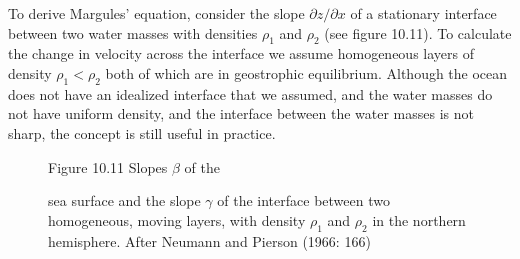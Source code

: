 To derive Margules' equation, consider the slope $\partial z/\partial x$ of a stationary
interface between two water masses with densities $\rho_1$ and $\rho_2$ (see
figure 10.11). To calculate the change in velocity across the interface we assume homogeneous
layers of density $\rho_1 < \rho_2$ both of which are in geostrophic
equilibrium. Although the ocean does
not have an idealized interface that we assumed, and the water masses do not have uniform
density, and the interface between the water masses is not sharp, the concept is still useful
in practice.

\begin{figure}[t!]
{}
\footnotesize
Figure 10.11 Slopes $\beta$ of the \rule{0mm}{4ex}sea surface and the slope
$\gamma$ of the interface between two homogeneous, moving layers, with density
$\rho_1$ and $\rho_2$ in the northern hemisphere. After Neumann and Pierson (1966: 166)

\label{fig:Fig10-10}
\vspace{-3ex}
\end{figure}

